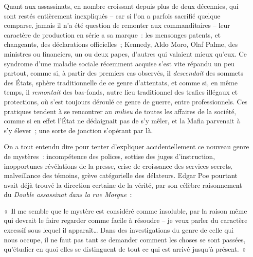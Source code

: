 \documentclass[french,twoside]{book} %
\def\mednobreak{\ifdim\lastskip<\medskipamount
  \removelastskip\nopagebreak\medskip\fi}
\newcommand{\labelblock}[1]{\medbreak{\noindent\color{rubric}\bfseries #1}\par\mednobreak}
\begin{document}
\labelblock{XXII}

\noindent Quant aux assassinats, en nombre croissant depuis plus de deux décennies, qui sont restés entièrement inexpliqués – car si l’on a parfois sacrifié quelque comparse, jamais il n’a été question de remonter aux commanditaires – leur caractère de production en série a sa marque : les mensonges patents, et changeants, des déclarations officielles ; Kennedy, Aldo Moro, Olaf Palme, des ministres ou financiers, un ou deux papes, d’autres qui valaient mieux qu’eux. Ce syndrome d’une maladie sociale récemment acquise s’est vite répandu un peu partout, comme si, à partir des premiers cas observés, il \emph{descendait} des sommets des États, sphère traditionnelle de ce genre d’attentats, et comme si, en même temps, il \emph{remontait} des bas-fonds, autre lieu traditionnel des trafics illégaux et protections, où s’est toujours déroulé ce genre de guerre, entre professionnels. Ces pratiques tendent à se rencontrer au \emph{milieu} de toutes les affaires de la société, comme si en effet l’État ne dédaignait pas de s’y mêler, et la Mafia parvenait à s’y élever ; une sorte de jonction s’opérant par là.\par
On a tout entendu dire pour tenter d’expliquer accidentellement ce nouveau genre de mystères : incompétence des polices, sottise des juges d’instruction, inopportunes révélations de la presse, crise de croissance des services secrets, malveillance des témoins, grève catégorielle des délateurs. Edgar Poe pourtant avait déjà trouvé la direction certaine de la vérité, par son célèbre raisonnement du \emph{Double assassinat dans la rue Morgue} :\par
« Il me semble que le mystère est considéré comme insoluble, par la raison même qui devrait le faire regarder comme facile à résoudre – je veux parler du caractère excessif sous lequel il apparaît… Dans des investigations du genre de celle qui nous occupe, il ne faut pas tant se demander comment les choses se sont passées, qu’étudier en quoi elles se distinguent de tout ce qui est arrivé jusqu’à présent. »\par

\labelblock{XXIII}
\end{document}
